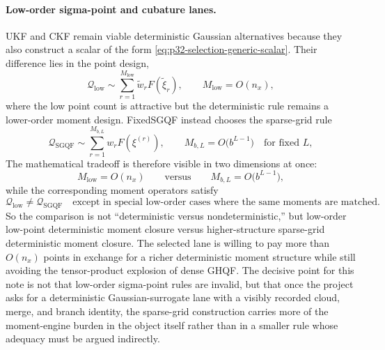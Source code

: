 \documentclass[11pt]{article}
\numberwithin{equation}{section}
\begin{document}
\paragraph{Low-order sigma-point and cubature lanes.}
UKF and CKF remain viable deterministic Gaussian alternatives because they also
construct a scalar of the form \eqref{eq:p32-selection-generic-scalar}.  Their
difference lies in the point design,
\begin{equation}
  \mathcal Q_{\mathrm{low}}
  \sim
  \sum_{r=1}^{M_{\mathrm{low}}} \tilde w_r F(\tilde \xi_r),
  \qquad
  M_{\mathrm{low}}=O(n_x),
  \label{eq:p32-selection-low-order}
\end{equation}
where the low point count is attractive but the deterministic rule remains a
lower-order moment design.  FixedSGQF instead chooses the sparse-grid rule
\begin{equation}
  \mathcal Q_{\mathrm{SGQF}}
  \sim
  \sum_{r=1}^{M_{b,L}} w_r F(\xi^{(r)}),
  \qquad
  M_{b,L}=O\!\bigl(b^{L-1}\bigr)
  \quad\text{for fixed }L,
  \label{eq:p32-selection-sparse-rule}
\end{equation}
The mathematical tradeoff is therefore visible in two dimensions at once:
\begin{equation}
  M_{\mathrm{low}}=O(n_x)
  \qquad\text{versus}\qquad
  M_{b,L}=O\!\bigl(b^{L-1}\bigr),
  \label{eq:p32-selection-pointcount-contrast}
\end{equation}
while the corresponding moment operators satisfy
\begin{equation}
  \mathcal Q_{\mathrm{low}}
  \neq
  \mathcal Q_{\mathrm{SGQF}}
  \quad\text{except in special low-order cases where the same moments are matched.}
  \label{eq:p32-selection-moment-contrast}
\end{equation}
So the comparison is not “deterministic versus nondeterministic,” but low-order
low-point deterministic moment closure versus higher-structure sparse-grid
deterministic moment closure.  The selected lane is willing to pay more than
\(O(n_x)\) points in exchange for a richer deterministic moment structure while
still avoiding the tensor-product explosion of dense GHQF.  The decisive point
for this note is not that low-order sigma-point rules are invalid, but that once
the project asks for a deterministic Gaussian-surrogate lane with a visibly
recorded cloud, merge, and branch identity, the sparse-grid construction carries
more of the moment-engine burden in the object itself rather than in a smaller
rule whose adequacy must be argued indirectly.
\end{document}
